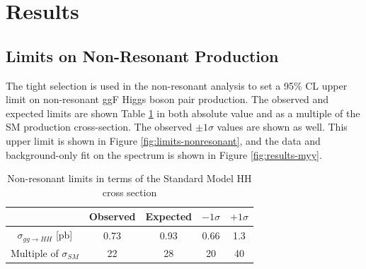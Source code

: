 \section{Results}



\subsection{Limits on Non-Resonant Production}

The tight selection is used in the non-resonant analysis to set a 95\% \gls{CL} upper limit on non-resonant \gls{ggF} Higgs boson pair production. The observed and expected limits are shown Table \ref{tab:nonresonant_results_SM} in both absolute value and as a multiple of the \gls{SM} production cross-section. The observed $\pm 1\sigma$ values are shown as well. This upper limit is shown in Figure \ref{fig:limits-nonresonant}, and the data and background-only fit on the \myy spectrum is shown in Figure \ref{fig:results-myy}.

\begin{table}[htbp]
  \centering 
  \caption{Non-resonant limits in terms of the Standard Model HH cross section}
  \label{tab:nonresonant_results_SM} 

  \begin{tabular}{ccccc}
  \hline
  & Observed & Expected & $-1\sigma$  & $+1\sigma$ \\
  \hline
  $\sigma_{gg\rightarrow HH}$ [pb] & 0.73 & 0.93 & 0.66 & 1.3\\
  Multiple of $\sigma_{SM}$ & 22 & 28 & 20 & 40 \\
  \hline
  \end{tabular}
\end{table}

